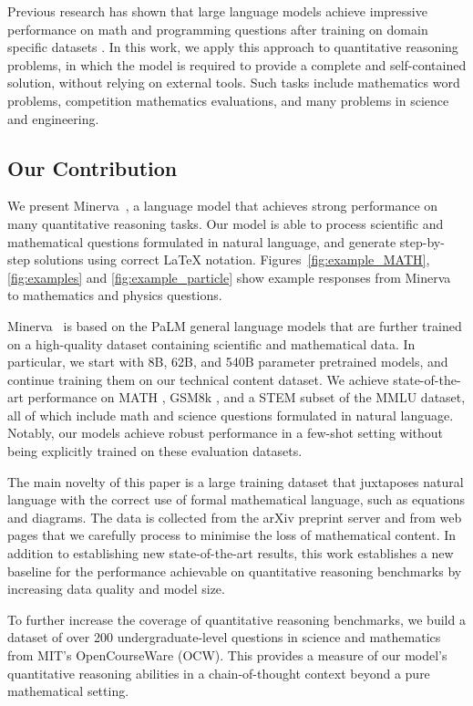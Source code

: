 Previous research has shown that large language models achieve impressive performance on math and programming questions after training on domain specific datasets \citep{codex,austin2021program,ocw_codex}. In this work, we apply this approach to quantitative reasoning problems, in which the model is required to provide a complete and self-contained solution, without relying on external tools. Such tasks include mathematics word problems, competition mathematics evaluations, and many problems in science and engineering.

\subsection{Our Contribution}

We present {Minerva~}\!\!, a language model that achieves strong performance on many quantitative reasoning tasks. Our model is able to process scientific and mathematical questions formulated in natural language, and generate step-by-step solutions using correct \LaTeX{} notation. 
Figures~\ref{fig:example_MATH}, \ref{fig:examples} and \ref{fig:example_particle} 
show example responses from {Minerva~} to mathematics and physics questions.

{Minerva~} is based on the {PaLM } general language models \cite{palm} that are further trained on a high-quality dataset containing scientific and mathematical data. In particular, we start with 8B, 62B, and 540B parameter pretrained models, and continue training them on our technical content dataset. We achieve state-of-the-art performance on MATH \cite{MATH}, GSM8k \cite{gsm8k}, and a STEM subset of the MMLU \cite{MMLU} dataset, all of which include math and science questions formulated in natural language. Notably, our models  achieve robust performance in a few-shot setting without being explicitly trained on these evaluation datasets.

The main novelty of this paper is a large training dataset that juxtaposes natural language with the correct use of formal mathematical language, such as equations and diagrams. The data is collected from the arXiv preprint server and from web pages that we carefully process to minimise the loss of mathematical content.  In addition to establishing new state-of-the-art results, this work establishes a new baseline for the performance achievable on quantitative reasoning benchmarks by increasing data quality and model size.

To further increase the coverage of quantitative reasoning benchmarks, we build a dataset of over 200 undergraduate-level questions in science and mathematics from MIT's OpenCourseWare (OCW). This provides a measure of our model's quantitative reasoning abilities in a chain-of-thought context beyond a pure mathematical setting.

